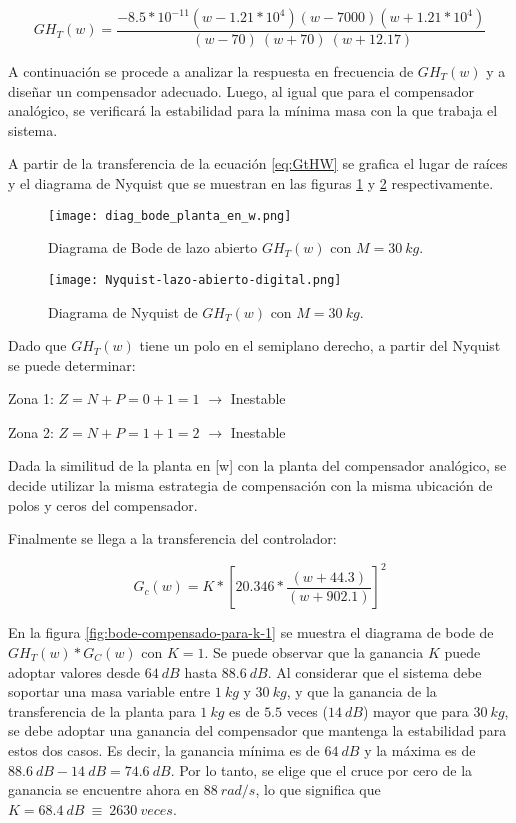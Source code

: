 \begin{equation}
	\label{eq:GtHW}  
	GH_{T}(w)=\frac{-8.5*10^{-11}(w-1.21*10^4)(w-7000)(w+1.21*10^4)}{\ (w-70)\ (w+70)\ (w+12.17)} 
\end{equation} 


\noindent A continuación se procede a analizar la respuesta en frecuencia de $GH_{T}(w)$ y a diseñar un compensador adecuado. Luego, al igual que para el compensador analógico, se verificará la estabilidad para la mínima masa  con la  que trabaja el sistema.

\noindent A partir de la transferencia de la ecuación  \ref{eq:GtHW} se  grafica el lugar de raíces y el diagrama de Nyquist que se muestran en las figuras \ref{fig:lugar-de-raices} y \ref{fig:nyquist-lazo-abierto-digital} respectivamente.

\begin{figure}[H]
	\centering
	\texttt{[image: diag\_bode\_planta\_en\_w.png]}
	\caption{Diagrama de Bode de lazo abierto $GH_{T}(w)$ con $M=30\:kg$.}
	\label{fig:lugar-de-raices}
\end{figure}

\begin{figure}[H]
	\centering
	\texttt{[image: Nyquist-lazo-abierto-digital.png]}
	\caption{Diagrama de Nyquist de $GH_{T}(w)$ con $M=30\:kg$.}
	\label{fig:nyquist-lazo-abierto-digital}
\end{figure}

\noindent Dado que ${GH}_{T}(w)$ tiene un polo en el semiplano derecho, a partir del Nyquist se puede determinar:

\noindent Zona 1: $Z=N+P=0+1=1$ $\mathrm{\to}$ Inestable 

\noindent Zona 2: $Z=N+P=1+1=2$ $\mathrm{\to}$ Inestable

\noindent Dada la similitud de la planta en [w] con la planta del compensador analógico, se decide utilizar la misma estrategia de compensación con la misma ubicación de polos y ceros del compensador.	

\noindent Finalmente se llega a la transferencia del controlador:


 \begin{equation}  
 	G_c(w)=K*{[20.346*\frac{(w+44.3)}{(w+902.1)}]}^2
 \end{equation} 
 


\noindent En la figura \ref{fig:bode-compensado-para-k-1} se muestra el diagrama de bode de ${GH}_T(w)*G_C(w)$ con $K=1$. Se puede observar que la ganancia $K$ puede adoptar valores desde $64\:dB$ hasta $88.6\:dB$. Al considerar que el sistema debe soportar una masa variable entre $1\:kg$ y $30\:kg$, y que la ganancia de la transferencia de la planta para $1\:kg$ es de $5.5$ veces ($14\:dB$) mayor que para $30\:kg$, se debe adoptar una ganancia del compensador que mantenga la estabilidad para estos dos casos. Es decir, la ganancia m\'{i}nima es de $64\:dB$ y la m\'{a}xima es de $88.6\:dB - 14\:dB = 74.6\:dB$. Por lo tanto, se elige que el cruce por cero de la ganancia se encuentre ahora en $88\:rad/s$, lo que significa que $K=68.4\:dB\ \equiv \ 2630\:veces$.


